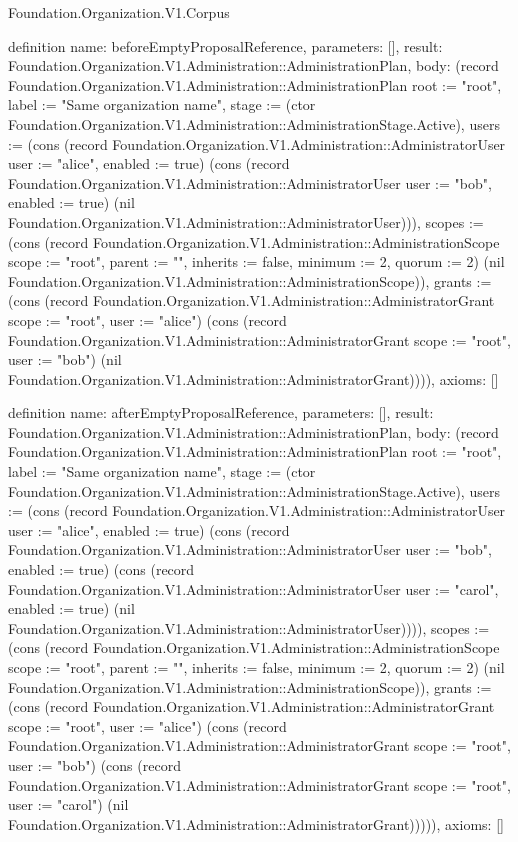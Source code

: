 \begin{lexlean}{Foundation.Organization.V1.Corpus}
\begin{semanticmodule}
definition{
  name: beforeEmptyProposalReference,
  parameters: [],
  result: Foundation.Organization.V1.Administration::AdministrationPlan,
  body: (record Foundation.Organization.V1.Administration::AdministrationPlan {root := "root", label := "Same organization name", stage := (ctor Foundation.Organization.V1.Administration::AdministrationStage.Active), users := (cons (record Foundation.Organization.V1.Administration::AdministratorUser {user := "alice", enabled := true}) (cons (record Foundation.Organization.V1.Administration::AdministratorUser {user := "bob", enabled := true}) (nil Foundation.Organization.V1.Administration::AdministratorUser))), scopes := (cons (record Foundation.Organization.V1.Administration::AdministrationScope {scope := "root", parent := "", inherits := false, minimum := 2, quorum := 2}) (nil Foundation.Organization.V1.Administration::AdministrationScope)), grants := (cons (record Foundation.Organization.V1.Administration::AdministratorGrant {scope := "root", user := "alice"}) (cons (record Foundation.Organization.V1.Administration::AdministratorGrant {scope := "root", user := "bob"}) (nil Foundation.Organization.V1.Administration::AdministratorGrant)))}),
  axioms: []
}

definition{
  name: afterEmptyProposalReference,
  parameters: [],
  result: Foundation.Organization.V1.Administration::AdministrationPlan,
  body: (record Foundation.Organization.V1.Administration::AdministrationPlan {root := "root", label := "Same organization name", stage := (ctor Foundation.Organization.V1.Administration::AdministrationStage.Active), users := (cons (record Foundation.Organization.V1.Administration::AdministratorUser {user := "alice", enabled := true}) (cons (record Foundation.Organization.V1.Administration::AdministratorUser {user := "bob", enabled := true}) (cons (record Foundation.Organization.V1.Administration::AdministratorUser {user := "carol", enabled := true}) (nil Foundation.Organization.V1.Administration::AdministratorUser)))), scopes := (cons (record Foundation.Organization.V1.Administration::AdministrationScope {scope := "root", parent := "", inherits := false, minimum := 2, quorum := 2}) (nil Foundation.Organization.V1.Administration::AdministrationScope)), grants := (cons (record Foundation.Organization.V1.Administration::AdministratorGrant {scope := "root", user := "alice"}) (cons (record Foundation.Organization.V1.Administration::AdministratorGrant {scope := "root", user := "bob"}) (cons (record Foundation.Organization.V1.Administration::AdministratorGrant {scope := "root", user := "carol"}) (nil Foundation.Organization.V1.Administration::AdministratorGrant))))}),
  axioms: []
}


\end{semanticmodule}
\end{lexlean}
